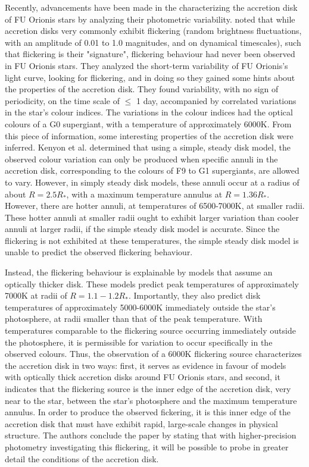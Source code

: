 \documentclass[iop,apj,tighten]{emulateapj}
\begin{document}
Recently, advancements have been made in the characterizing the accretion disk of FU Orionis stars by analyzing their photometric variability. \cite{kenyon_flickering_2000} noted that while accretion disks very commonly exhibit flickering (random brightness fluctuations, with an amplitude of 0.01 to 1.0 magnitudes, and on dynamical timescales), such that flickering is their "signature", flickering behaviour had never been observed in FU Orionis stars. They analyzed the short-term variability of FU Orionis's light curve, looking for flickering, and in doing so they gained some hints about the properties of the accretion disk. They found variability, with no sign of periodicity, on the time scale of $\leq$ 1 day, accompanied by correlated variations in the star's colour indices. The variations in the colour indices had the optical colours of a G0 supergiant, with a temperature of approximately 6000K. From this piece of information, some interesting properties of the accretion disk were inferred. Kenyon et al. determined that using a simple, steady disk model, the observed colour variation can only be produced when specific annuli in the accretion disk, corresponding to the colours of F9 to G1 supergiants, are allowed to vary. However, in simply steady disk models, these annuli occur at a radius of about $R=2.5R_{*}$, with a maximum temperature annulus at $R=1.36R_{*}$. However, there are hotter annuli, at temperatures of 6500-7000K, at smaller radii. These hotter annuli at smaller radii ought to exhibit larger variation than cooler annuli at larger radii, if the simple steady disk model is accurate. Since the flickering is not exhibited at these temperatures, the simple steady disk model is unable to predict the observed flickering behaviour.

Instead, the flickering behaviour is explainable by models that assume an optically thicker disk. These models predict peak temperatures of approximately 7000K at radii of $R=1.1-1.2R_{*}$. Importantly, they also predict disk temperatures of approximately 5000-6000K immediately outside the star's photosphere, at radii smaller than that of the peak temperature. With temperatures comparable to the flickering source occurring immediately outside the photosphere, it is permissible for variation to occur specifically in the observed colours. Thus, the observation of a 6000K flickering source characterizes the accretion disk in two ways: first, it serves as evidence in favour of models with optically thick accretion disks around FU Orionis stars, and second, it indicates that the flickering source is the inner edge of the accretion disk, very near to the star, between the star's photosphere and the maximum temperature annulus. In order to produce the observed fickering, it is this inner edge of the accretion disk that must have exhibit rapid, large-scale changes in physical structure. The authors conclude the paper by stating that with higher-precision photometry investigating this flickering, it will be possible to probe in greater detail the conditions of the accretion disk.
\end{document}

